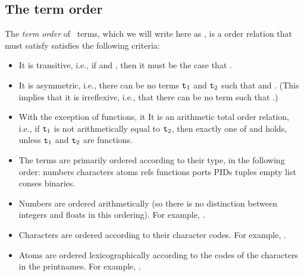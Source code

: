 \subsection{The term order}

\label{section:term-order}

The \emph{term order} of \Erlang\ terms, which we will write here as
\T{<}, is a order relation that \ifStd must satisfy \fi \ifOld satisfies \fi
the following criteria:

\begin{itemize}
\item It is transitive, i.e., if  and
, then it must be the case that
.
\item It is asymmetric, i.e., there can be no terms ${\tt{\sl t}}_1$ and ${\tt{\sl t}}_2$
such that \mbox{} and \mbox{}.
(This implies that it is irreflexive, i.e., that
there can be no term  such that .)
\item \ifStd With the exception of functions, it \fi
\ifOld It \fi
is an arithmetic total order relation, i.e., if
${\tt{\sl t}}_1$ is not arithmetically equal to
${\tt{\sl t}}_2$, then exactly one of  and
 holds, unless ${\tt{\sl t}}_1$ and ${\tt{\sl t}}_2$ are functions.

\item The terms are primarily ordered according to their type, in the following order:
numbers \T{<} \ifStd characters \T{<} \fi
atoms \T{<} refs \T{<} \ifStd functions \T{<} \fi
ports \T{<} PIDs \T{<} tuples \T{<}
empty list \T{<} conses \T{<} binaries.

\item Numbers are ordered arithmetically (so there is no distinction between integers
and floats in this ordering).  For example, .

\ifStd
\item Characters are ordered according to their character codes.
For example, .
\fi

\item Atoms are ordered lexicographically according to the codes of the characters in
the printnames.  For example, .


\end{itemize}
